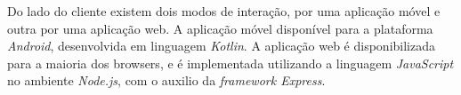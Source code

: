 Do lado do cliente existem dois modos de interação, por uma aplicação móvel e outra por uma aplicação web. A aplicação móvel disponível para a plataforma \textit{Android}, desenvolvida em linguagem \textit{Kotlin}. A aplicação web é disponibilizada para a maioria dos browsers, e é implementada utilizando a linguagem \textit{JavaScript} no ambiente \textit{Node.js}, com o auxilio da \textit{framework Express}.
